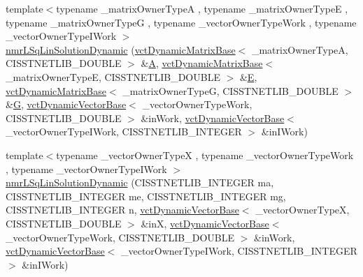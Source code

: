 \begin{DoxyCompactItemize}
{\footnotesize template$<$typename \+\_\+matrix\+Owner\+Type\+A , typename \+\_\+matrix\+Owner\+Type\+E , typename \+\_\+matrix\+Owner\+Type\+G , typename \+\_\+vector\+Owner\+Type\+Work , typename \+\_\+vector\+Owner\+Type\+I\+Work $>$ }\\\hyperlink{classnmr_l_sq_lin_solution_dynamic_a2345c96cf2cdd3338d72e789eb2e8101}{nmr\+L\+Sq\+Lin\+Solution\+Dynamic} (\hyperlink{classvct_dynamic_matrix_base}{vct\+Dynamic\+Matrix\+Base}$<$ \+\_\+matrix\+Owner\+Type\+A, C\+I\+S\+S\+T\+N\+E\+T\+L\+I\+B\+\_\+\+D\+O\+U\+B\+L\+E $>$ \&\hyperlink{classnmr_l_sq_lin_solution_dynamic_aa4a41abac141e2e55dd5cafb59169dfd}{A}, \hyperlink{classvct_dynamic_matrix_base}{vct\+Dynamic\+Matrix\+Base}$<$ \+\_\+matrix\+Owner\+Type\+E, C\+I\+S\+S\+T\+N\+E\+T\+L\+I\+B\+\_\+\+D\+O\+U\+B\+L\+E $>$ \&\hyperlink{classnmr_l_sq_lin_solution_dynamic_a7c1ac112b07f3edd33d348fe0a40fb71}{E}, \hyperlink{classvct_dynamic_matrix_base}{vct\+Dynamic\+Matrix\+Base}$<$ \+\_\+matrix\+Owner\+Type\+G, C\+I\+S\+S\+T\+N\+E\+T\+L\+I\+B\+\_\+\+D\+O\+U\+B\+L\+E $>$ \&\hyperlink{classnmr_l_sq_lin_solution_dynamic_a399cb314fb848d36f58c14830bad0c28}{G}, \hyperlink{classvct_dynamic_vector_base}{vct\+Dynamic\+Vector\+Base}$<$ \+\_\+vector\+Owner\+Type\+Work, C\+I\+S\+S\+T\+N\+E\+T\+L\+I\+B\+\_\+\+D\+O\+U\+B\+L\+E $>$ \&in\+Work, \hyperlink{classvct_dynamic_vector_base}{vct\+Dynamic\+Vector\+Base}$<$ \+\_\+vector\+Owner\+Type\+I\+Work, C\+I\+S\+S\+T\+N\+E\+T\+L\+I\+B\+\_\+\+I\+N\+T\+E\+G\+E\+R $>$ \&in\+I\+Work)
\item 
{\footnotesize template$<$typename \+\_\+vector\+Owner\+Type\+X , typename \+\_\+vector\+Owner\+Type\+Work , typename \+\_\+vector\+Owner\+Type\+I\+Work $>$ }\\\hyperlink{classnmr_l_sq_lin_solution_dynamic_ab881784eb8ed36947421b893d5abeeb7}{nmr\+L\+Sq\+Lin\+Solution\+Dynamic} (C\+I\+S\+S\+T\+N\+E\+T\+L\+I\+B\+\_\+\+I\+N\+T\+E\+G\+E\+R ma, C\+I\+S\+S\+T\+N\+E\+T\+L\+I\+B\+\_\+\+I\+N\+T\+E\+G\+E\+R me, C\+I\+S\+S\+T\+N\+E\+T\+L\+I\+B\+\_\+\+I\+N\+T\+E\+G\+E\+R mg, C\+I\+S\+S\+T\+N\+E\+T\+L\+I\+B\+\_\+\+I\+N\+T\+E\+G\+E\+R n, \hyperlink{classvct_dynamic_vector_base}{vct\+Dynamic\+Vector\+Base}$<$ \+\_\+vector\+Owner\+Type\+X, C\+I\+S\+S\+T\+N\+E\+T\+L\+I\+B\+\_\+\+D\+O\+U\+B\+L\+E $>$ \&in\+X, \hyperlink{classvct_dynamic_vector_base}{vct\+Dynamic\+Vector\+Base}$<$ \+\_\+vector\+Owner\+Type\+Work, C\+I\+S\+S\+T\+N\+E\+T\+L\+I\+B\+\_\+\+D\+O\+U\+B\+L\+E $>$ \&in\+Work, \hyperlink{classvct_dynamic_vector_base}{vct\+Dynamic\+Vector\+Base}$<$ \+\_\+vector\+Owner\+Type\+I\+Work, C\+I\+S\+S\+T\+N\+E\+T\+L\+I\+B\+\_\+\+I\+N\+T\+E\+G\+E\+R $>$ \&in\+I\+Work)

\end{DoxyCompactItemize}
